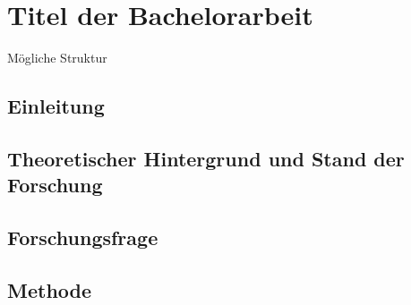 \chapter{Titel der Bachelorarbeit}

Mögliche Struktur

\section{Einleitung}

\section{Theoretischer Hintergrund und Stand der Forschung}

\section{Forschungsfrage}

\section{Methode}

